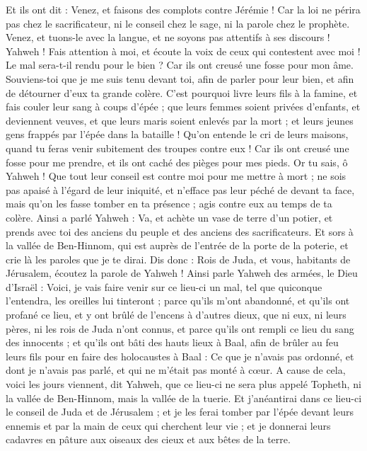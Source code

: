 \begin{multicols}{2}
Et ils ont dit : Venez, et faisons des complots contre Jérémie ! Car la loi ne périra pas chez le sacrificateur, ni le conseil chez le sage, ni la parole chez le prophète. Venez, et tuons-le avec la langue, et ne soyons pas attentifs à ses discours !
Yahweh ! Fais attention à moi, et écoute la voix de ceux qui contestent avec moi !
Le mal sera-t-il rendu pour le bien ? Car ils ont creusé une fosse pour mon âme. Souviens-toi que je me suis tenu devant toi, afin de parler pour leur bien, et afin de détourner d'eux ta grande colère.
C'est pourquoi livre leurs fils à la famine, et fais couler leur sang à coups d’épée ; que leurs femmes soient privées d'enfants, et deviennent veuves, et que leurs maris soient enlevés par la mort ; et leurs jeunes gens frappés par l'épée dans la bataille !
Qu'on entende le cri de leurs maisons, quand tu feras venir subitement des troupes contre eux ! Car ils ont creusé une fosse pour me prendre, et ils ont caché des pièges pour mes pieds.
Or tu sais, ô Yahweh ! Que tout leur conseil est contre moi pour me mettre à mort ; ne sois pas apaisé à l'égard de leur iniquité, et n'efface pas leur péché de devant ta face, mais qu'on les fasse tomber en ta présence ; agis contre eux au temps de ta colère.
\VerseOne{}Ainsi a parlé Yahweh : Va, et achète un vase de terre d'un potier, et prends avec toi des anciens du peuple et des anciens des sacrificateurs.
Et sors à la vallée de Ben-Hinnom, qui est auprès de l'entrée de la porte de la poterie, et crie là les paroles que je te dirai.
Dis donc : Rois de Juda, et vous, habitants de Jérusalem, écoutez la parole de Yahweh ! Ainsi parle Yahweh des armées, le Dieu d'Israël : Voici, je vais faire venir sur ce lieu-ci un mal, tel que quiconque l'entendra, les oreilles lui tinteront ; 
parce qu'ils m'ont abandonné, et qu'ils ont profané ce lieu, et y ont brûlé de l'encens à d'autres dieux, que ni eux, ni leurs pères, ni les rois de Juda n'ont connus, et parce qu'ils ont rempli ce lieu du sang des innocents ;
et qu'ils ont bâti des hauts lieux à Baal, afin de brûler au feu leurs fils pour en faire des holocaustes à Baal : Ce que je n'avais pas ordonné, et dont je n'avais pas parlé, et qui ne m'était pas monté à cœur.
A cause de cela, voici les jours viennent, dit Yahweh, que ce lieu-ci ne sera plus appelé Topheth, ni la vallée de Ben-Hinnom, mais la vallée de la tuerie.
Et j'anéantirai dans ce lieu-ci le conseil de Juda et de Jérusalem ; et je les ferai tomber par l'épée devant leurs ennemis et par la main de ceux qui cherchent leur vie ; et je donnerai leurs cadavres en pâture aux oiseaux des cieux et aux bêtes de la terre.

\end{multicols}
